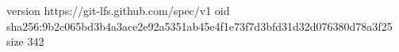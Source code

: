version https://git-lfs.github.com/spec/v1
oid sha256:9b2c065bd3b4a3ace2e92a5351ab45e4f1e73f7d3bfd31d32d076380d78a3f25
size 342
